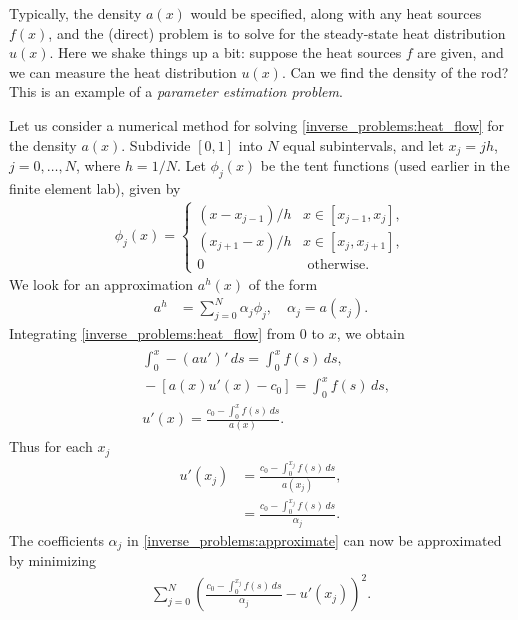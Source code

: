 Typically, the density $a(x)$ would be specified, along with any heat sources $f(x)$, and the (direct) problem is to solve for the steady-state heat distribution $u(x)$.
Here we shake things up a bit: suppose the heat sources $f$ are given, and we can measure the heat distribution $u(x)$.
Can we find the density of the rod?
This is an example of a \textit{parameter estimation problem}.

Let us consider a numerical method for solving \eqref{inverse_problems:heat_flow} for the density $a(x)$.
Subdivide $[0,1]$ into $N$ equal subintervals, and let $x_j = jh$, $j = 0, \ldots,N$, where $h = 1/N$.
Let $\phi_j(x)$ be the tent functions (used earlier in the finite element lab), given by 
\begin{align*}
	\phi_j(x) = \begin{cases}
(x - x_{j-1})/h  &  x \in [x_{j-1},x_j],\\
 (x_{j+1} - x)/h  &  x \in [x_{j},x_{j+1}],\\
0 & \text{ otherwise.}
\end{cases}
\end{align*}
We look for an approximation $a^h(x)$ of the form 
\begin{align}
	a^h &= \sum_{j=0}^N \alpha_j \phi_j, \quad \alpha_j=a(x_j).
\label{inverse_problems:approximate}
\end{align}
Integrating \eqref{inverse_problems:heat_flow} from $0$ to $x$, we obtain
\begin{align}
\begin{split}
&{} \int_0^x -(au')'\, ds = \int_0^x f(s)\, ds,\\
&{} -[a(x)u'(x) - c_0] = \int_0^x f(s)\, ds,\\
&{} u'(x) = \frac{c_0 - \int_0^x f(s)\, ds}{a(x)}.
\end{split}
\end{align}
Thus for each $x_j$
\begin{align*}
	u'(x_j) &= \frac{c_0 - \int_0^{x_j} f(s)\, ds}{a(x_j)},\\
	&= \frac{c_0 - \int_0^{x_j} f(s)\, ds}{\alpha_j}.
\end{align*}
The coefficients $\alpha_j$ in \eqref{inverse_problems:approximate} can now be approximated by minimizing 
\begin{align*}
	\sum_{j=0}^N \left( \frac{c_0 - \int_0^{x_j} f(s)\, ds}{\alpha_j} - u'(x_j)  \right)^2.
\end{align*}
